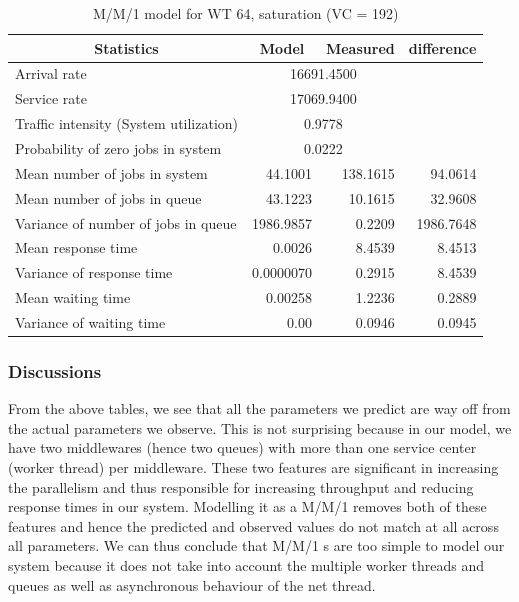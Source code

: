 \documentclass[11pt,a4paper]{article}
\begin{document}
\begin{table}[H]
	\centering
	\caption{M/M/1 model for WT 64, saturation (VC = 192)}
	\begin{tabular}{|l|r|r|r|}
		\hline
		\multicolumn{1}{|c|}{Statistics} & \multicolumn{1}{c|}{Model} & \multicolumn{1}{c|}{Measured} & \multicolumn{1}{c|}{difference} \\ \hline
		Arrival rate & \multicolumn{ 2}{c|}{16691.4500} & \multicolumn{1}{l|}{} \\ \hline
		Service rate & \multicolumn{ 2}{c|}{17069.9400} & \multicolumn{1}{l|}{} \\ \hline
		Traffic intensity (System utilization) & \multicolumn{ 2}{c|}{0.9778} & \multicolumn{1}{l|}{} \\ \hline
		Probability of zero jobs in system & \multicolumn{ 2}{c|}{0.0222} & \multicolumn{1}{l|}{} \\ \hline
		Mean number of jobs in system & 44.1001 & 138.1615 & 94.0614 \\ \hline
		Mean number of jobs in queue & 43.1223 & 10.1615 & 32.9608 \\ \hline
		Variance of number of jobs in queue & 1986.9857 & 0.2209 & 1986.7648 \\ \hline
		Mean response time & 0.0026 & 8.4539 & 8.4513 \\ \hline
		Variance of response time & 0.0000070 & 0.2915 & 8.4539 \\ \hline
		Mean waiting time & 0.00258 & 1.2236 & 0.2889 \\ \hline
		Variance of waiting time & 0.00 & 0.0946 & 0.0945 \\ \hline
	\end{tabular}
	\label{}
\end{table}


\subsubsection{Discussions}
From the above tables, we see that all the parameters we predict are way off from the actual parameters we observe. This is not surprising because in our model, we have two middlewares (hence two queues) with more than one service center (worker thread) per middleware. These two features are significant in increasing the parallelism and thus responsible for increasing throughput and reducing response times in our system. Modelling it as a M/M/1 removes both of these features and hence the predicted and observed values do not match at all across all parameters. We can thus conclude that M/M/1 s are too simple to model our system because it does not take into account the multiple worker threads and queues as well as asynchronous behaviour of the net thread.
\end{document}
